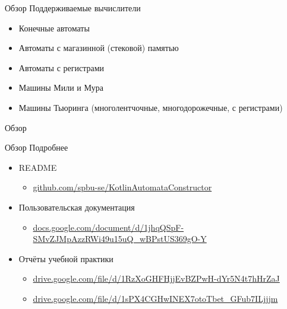 \documentclass[xetex,mathserif,serif]{beamer}
\begin{document}
        \begin{frame}{Обзор}
            Поддерживаемые вычислители
            \begin{itemize}
                \item Конечные автоматы
                \item Автоматы с магазинной (стековой) памятью
                \item Автоматы с регистрами
                \item Машины Мили и Мура
                \item Машины Тьюринга (многолентчочные, многодорожечные, с регистрами)
            \end{itemize}
        \end{frame}
        
        \begin{frame}{Обзор}
        \end{frame}
        
        \begin{frame}{Обзор}
            Подробнее
            \begin{itemize}
                \item README
                    \begin{itemize}
                        \item \url{github.com/spbu-se/KotlinAutomataConstructor}
                    \end{itemize}
                \item Пользовательская документация
                    \begin{itemize}
                        \item \url{docs.google.com/document/d/1jhqQSpF-SMvZJMpAzzRWi49u15uQ_wBPstUS369gO-Y}
                    \end{itemize}
                \item Отчёты учебной практики
                    \begin{itemize}
                        \item \url{drive.google.com/file/d/1RzXoGHFHjjEvBZPwH-dYr5N4t7hHrZaJ}
                        \item \url{drive.google.com/file/d/1sPX4CGHwINEX7otoTbet_GFub7ILjjjm}
                    \end{itemize}
            \end{itemize}
        \end{frame}
        
\end{document}
